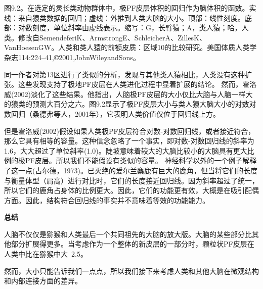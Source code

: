 \par
图9.2。在选定的灵长类动物群体中，极PF皮层体积的回归作为脑体积的函数。实线：来自猿类数据的回归；虚线：外推到人类大脑的大小。顶部：线性刻度。底部：对数刻度，单位斜率由虚线表示。缩写：G，长臂猿；A，类人猿；哈，人类。修改自SemendeferiK、ArmstrongE、SchleicherA、ZillesK、VanHoesenGW。人类和类人猿的前额皮质：区域10的比较研究。美国体质人类学杂志114:224–41,©2001,JohnWileyandSons。
\par
同一作者对第13区进行了类似的分析，发现与其他类人猿相比，人类没有这种扩张。这些发现支持了极地PF皮层在人类进化过程中显着扩展的结论。
然而，霍洛威(2002)淡化了这些结果。他指出，人脑极PF皮层的大小仅比大脑与人脑一样大的猿类的预测大百分之六。图9.2显示了极PF皮层大小与类人猿大脑大小的对数对数回归（桑德弗等人，2001年），它表明人类价值仅位于回归线上方。
\par
但是霍洛威(2002)假设如果人类极PF皮层符合对数-对数回归线，或者接近符合，那么它具有相等的容量。这种信念忽略了一个事实，即对数-对数回归线的斜率为1.6，大大超过了单位斜率(1.0)。陡坡意味着较大的大脑比较小的大脑具有更大比例的极PF皮层。所以我们不能假设有类似的容量。
神经科学以外的一个例子解释了这一点(古尔德，1973)。已灭绝的爱尔兰麋鹿有巨大的鹿角，但当将它们的长度与衡量体型（肩高）进行对比时，它们的长度接近回归线。因为斜率超过了统一，所以它们的鹿角占身体的比例更大。因此，它们的功能更有效，大概是在吸引配偶方面。因此，结构符合回归线的事实并不意味着等效的功能能力。
\par
\textbf{总结}
\par
人脑不仅仅是猕猴和人类最后一个共同祖先的大脑的放大版。大脑的某些部分比其他部分扩展得更多。当考虑作为一个整体的新皮层的一部分时，颗粒状PF皮层在人类中比在猕猴中大~2.5。
\par
然而，大小只能告诉我们一点点，所以我们接下来考虑人类和其他大脑在微观结构和内部连接方面的差异。
